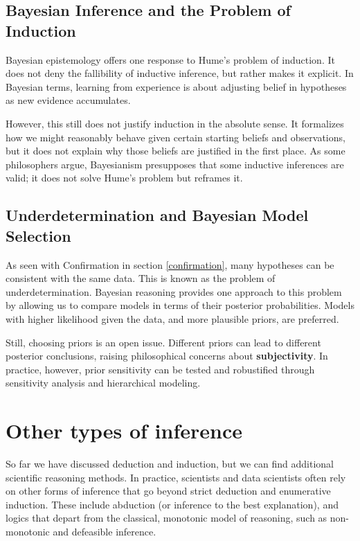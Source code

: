 \documentclass[
  12pt,
]{book}
\begin{document}
\subsection{Bayesian Inference and the Problem of Induction}\label{bayesian-inference-and-the-problem-of-induction}

Bayesian epistemology offers one response to Hume's problem of induction. It does not deny the fallibility of inductive inference, but rather makes it explicit. In Bayesian terms, learning from experience is about adjusting belief in hypotheses as new evidence accumulates.

However, this still does not justify induction in the absolute sense. It formalizes how we might reasonably behave given certain starting beliefs and observations, but it does not explain why those beliefs are justified in the first place. As some philosophers argue, Bayesianism presupposes that some inductive inferences are valid; it does not solve Hume's problem but reframes it.

\subsection{Underdetermination and Bayesian Model Selection}\label{underdetermination-and-bayesian-model-selection}

As seen with Confirmation in section \ref{confirmation}, many hypotheses can be consistent with the same data. This is known as the problem of underdetermination. Bayesian reasoning provides one approach to this problem by allowing us to compare models in terms of their posterior probabilities. Models with higher likelihood given the data, and more plausible priors, are preferred.

Still, choosing priors is an open issue. Different priors can lead to different posterior conclusions, raising philosophical concerns about \textbf{subjectivity}. In practice, however, prior sensitivity can be tested and robustified through sensitivity analysis and hierarchical modeling.

\section{Other types of inference}\label{other-types-of-inference}

So far we have discussed deduction and induction, but we can find additional scientific reasoning methods. In practice, scientists and data scientists often rely on other forms of inference that go beyond strict deduction and enumerative induction. These include abduction (or inference to the best explanation), and logics that depart from the classical, monotonic model of reasoning, such as non-monotonic and defeasible inference.
\end{document}
